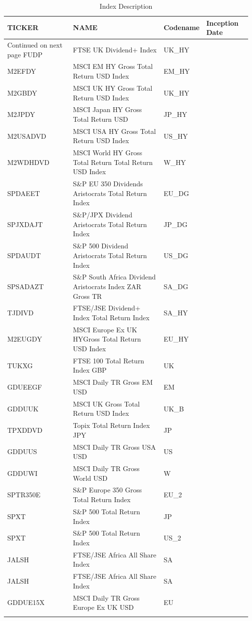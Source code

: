 \documentclass[10pt,preprint, authoryear]{elsarticle}
\numberwithin{equation}{section}
\numberwithin{figure}{section}
\numberwithin{table}{section}
\begin{document}
\begingroup\fontsize{8pt}{9pt}\selectfont
\begin{longtable}{llll}
  \toprule
TICKER & NAME & Codename & Inception Date \\ 
  \hline 
\endhead 
\hline 
{\footnotesize Continued on next page} 
\endfoot 
\endlastfoot 
 \midrule
FUDP & FTSE UK Dividend+ Index & UK\_HY &  \\ 
  M2EFDY & MSCI EM HY Gross Total Return USD Index & EM\_HY &  \\ 
  M2GBDY & MSCI UK HY Gross Total Return USD Index & UK\_HY &  \\ 
  M2JPDY & MSCI Japan HY Gross Total Return USD & JP\_HY &  \\ 
  M2USADVD & MSCI USA HY Gross Total Return USD Index & US\_HY &  \\ 
  M2WDHDVD & MSCI World HY Gross Total Return Total Return USD Index & W\_HY &  \\ 
  SPDAEET & S\&P EU 350 Dividends Aristocrats Total Return Index & EU\_DG &  \\ 
  SPJXDAJT & S\&P/JPX Dividend Aristocrats Total Return Index & JP\_DG &  \\ 
  SPDAUDT & S\&P 500 Dividend Aristocrats Total Return Index & US\_DG &  \\ 
  SPSADAZT & S\&P South Africa Dividend Aristocrats Index ZAR Gross TR & SA\_DG &  \\ 
  TJDIVD & FTSE/JSE Dividend+ Index Total Return Index & SA\_HY &  \\ 
  M2EUGDY & MSCI Europe Ex UK HYGross Total Return USD Index & EU\_HY &  \\ 
  TUKXG & FTSE 100 Total Return Index GBP & UK &  \\ 
  GDUEEGF & MSCI Daily TR Gross EM USD & EM &  \\ 
  GDDUUK & MSCI UK Gross Total Return USD Index & UK\_B &  \\ 
  TPXDDVD & Topix Total Return Index JPY & JP &  \\ 
  GDDUUS & MSCI Daily TR Gross USA USD & US &  \\ 
  GDDUWI & MSCI Daily TR Gross World USD & W &  \\ 
  SPTR350E & S\&P Europe 350 Gross Total Return Index & EU\_2 &  \\ 
  SPXT & S\&P 500 Total Return Index & JP &  \\ 
  SPXT & S\&P 500 Total Return Index & US\_2 &  \\ 
  JALSH & FTSE/JSE Africa All Share Index & SA &  \\ 
  JALSH & FTSE/JSE Africa All Share Index & SA &  \\ 
  GDDUE15X & MSCI Daily TR Gross Europe Ex UK USD & EU &  \\ 
   \bottomrule
\caption{Index Description \label{indexdes}} 
\end{longtable}
\endgroup
\end{document}
